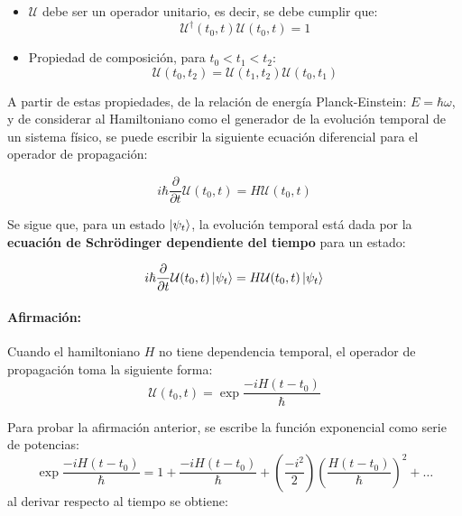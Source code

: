 \begin{itemize}[label=\textcolor{CTtitle}{\textbullet}]
\item $\mathcal{U}$ debe ser un operador unitario, es decir, se debe cumplir que: $$\mathcal{U}^\dag(t_0,t)\mathcal{U}(t_0,t)=1$$
\item Propiedad de composición, para $t_0<t_1<t_2$: $$\mathcal{U}(t_0,t_2) = \mathcal{U}(t_1,t_2)\mathcal{U}(t_0,t_1)$$  
\end{itemize}

A partir de estas propiedades, de la relación de energía Planck-Einstein: $E=\hbar\omega$, y de considerar al Hamiltoniano como el generador de la evolución temporal de un sistema físico\cite{Sakurai:1994}, se puede escribir la siguiente ecuación diferencial para el operador de propagación:

\begin{equation}
  \label{eq:TDSE operator}
  i\hbar\frac{\partial}{\partial t}\mathcal{U}(t_0,t) = H\mathcal{U}(t_0,t)
\end{equation}

Se sigue que, para un estado $\ket{\psi_{t}}$, la evolución temporal está dada por la \textbf{ecuación de Schrödinger dependiente del tiempo} para un estado:

\begin{tcolorbox}[colback=CTtitle!5!white,colframe=CTtitle!85!white]%
\begin{equation}
\label{eq:TDSE ket}
i\hbar\frac{\partial}{\partial t}\mathcal{U}(t_0,t)\ket{\psi_{t}} = H\mathcal{U}(t_0,t)\ket{\psi_{t}}
\end{equation}
\end{tcolorbox}

\paragraph{Afirmación:}
  Cuando el hamiltoniano $H$ no tiene dependencia temporal, el operador de propagación toma la siguiente forma:
\begin{equation}
\label{eq:U IT}
\mathcal{U}(t_0,t) = \exp{\frac{-iH(t-t_0)}{\hbar}}
\end{equation}

Para probar la afirmación anterior, se escribe la función exponencial como serie de potencias:
$$\exp{\frac{-iH(t-t_0)}{\hbar}} = 1 + \frac{-iH(t-t_0)}{\hbar}+ \left(\frac{-i^2}{2}\right)\left(\frac{H(t-t_0)}{\hbar}\right)^2+\dots $$
al derivar respecto al tiempo se obtiene:

